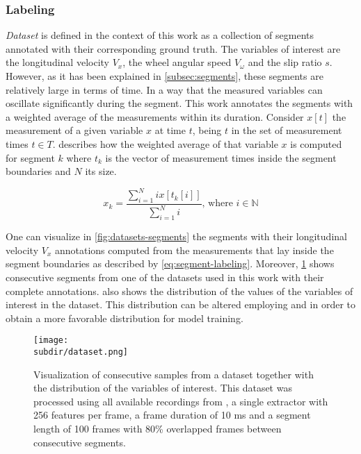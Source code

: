 \subsubsection{Labeling} \label{subsec:labeling}

\emph{Dataset} is defined in the context of this work as a collection of
segments annotated with their corresponding ground truth. The variables of
interest are the longitudinal velocity $V_x$, the wheel angular speed
$V_\omega$ and the slip ratio $s$. However, as it has been explained in
\cref{subsec:segments}, these segments are relatively large in terms of time.
In a way that the measured variables can oscillate significantly during the
segment. This work annotates the segments with a weighted average of the
measurements within its duration. Consider $x[t]$ the measurement of a given
variable $x$ at time $t$, being $t$ in the set of measurement times $t \in T$.
 describes how the weighted average of that variable
$x$ is computed for segment $k$ where $t_k$ is the vector of measurement times
inside the segment boundaries and $N$ its size.

\begin{equation}
    x_k = \frac{\sum_{i = 1}^N i  x[t_k[i]]}{\sum_{i = 1}^N i}\text{, where } i \in  \mathbb{N}
    \label{eq:segment-labeling}
\end{equation}

One can visualize in \cref{fig:datasets-segments} the segments with their
longitudinal velocity $V_x$ annotations computed from the measurements that lay
inside the segment boundaries as described by \cref{eq:segment-labeling}.
Moreover, \cref{fig:dataset-visualization} shows consecutive segments from one
of the datasets used in this work with their complete annotations.
 also shows the distribution of the values of
the variables of interest in the dataset. This distribution can be altered
employing  and  in
order to obtain a more favorable distribution for model training.

\begin{figure}
    \centering
    \texttt{[image: \\subdir/dataset.png]}
    \caption[Dataset visualization]{Visualization of consecutive samples from a
        dataset together with the distribution of the variables of interest.
        This dataset was processed using all available recordings from
        , a single
         extractor with 256 features
        per frame, a frame duration of 10 ms and a segment length of 100 frames
        with 80\% overlapped frames between consecutive segments. }
    \label{fig:dataset-visualization}
\end{figure}

